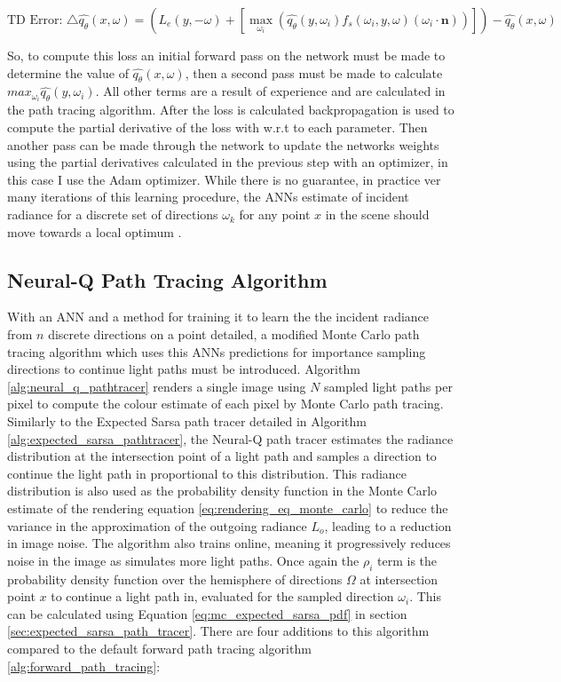 \documentclass[../dissertation.tex]{subfiles}
\begin{document}
$$\text{TD Error: } \triangle \hat{q_\theta}(x, \omega) = \left( L_e(y, -\omega) + \left[ \max_{\omega_i} \left(\hat{q_\theta}(y, \omega_i) f_s(\omega_i, y, \omega) (\omega_i \cdot \mathbf{n}) \right) \right] \right) - \hat{q_\theta}(x, \omega)$$

So, to compute this loss an initial forward pass on the network must be made to determine the value of $\hat{q_\theta}(x, \omega)$, then a second pass must be made to calculate $max_{\omega_i} \hat{q_\theta}(y, \omega_i)$. All other terms are a result of experience and are calculated in the path tracing algorithm. After the loss is calculated backpropagation is used to compute the partial derivative of the loss with w.r.t to each parameter. Then another pass can be made through the network to update the networks weights using the partial derivatives calculated in the previous step with an optimizer, in this case I use the Adam optimizer. While there is no guarantee, in practice ver many iterations of this learning procedure, the ANNs estimate of incident radiance for a discrete set of directions $\omega_k$ for any point $x$ in the scene should move towards a local optimum \cite{deep_rl_function_approx}.

\subsection{Neural-Q Path Tracing Algorithm}

With an ANN and a method for training it to learn the the incident radiance from $n$ discrete directions on a point detailed, a modified Monte Carlo path tracing algorithm which uses this ANNs predictions for importance sampling directions to continue light paths must be introduced. Algorithm \ref{alg:neural_q_pathtracer} renders a single image using $N$ sampled light paths per pixel to compute the colour estimate of each pixel by Monte Carlo path tracing. Similarly to the Expected Sarsa path tracer detailed in Algorithm \ref{alg:expected_sarsa_pathtracer}, the Neural-Q path tracer estimates the radiance distribution at the intersection point of a light path and samples a direction to continue the light path in proportional to this distribution. This radiance distribution is also used as the probability density function in the Monte Carlo estimate of the rendering equation \ref{eq:rendering_eq_monte_carlo} to reduce the variance in the approximation of the outgoing radiance $L_o$, leading to a reduction in image noise. The algorithm also trains online, meaning it progressively reduces noise in the image as simulates more light paths. Once again the $\rho_i$ term is the probability density function over the hemisphere of directions $\Omega$ at intersection point $x$ to continue a light path in, evaluated for the sampled direction $\omega_i$. This can be calculated using Equation \ref{eq:mc_expected_sarsa_pdf} in section \ref{sec:expected_sarsa_path_tracer}. There are four additions to this algorithm compared to the default forward path tracing algorithm \ref{alg:forward_path_tracing}:
\end{document}
